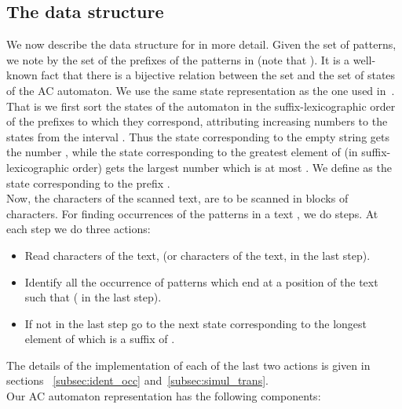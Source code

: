 \documentclass{article}
\newcommand{\?}{\mskip1.5mu}
\begin{document}
\subsection{The data structure}
We now describe the data structure for in more detail. Given the set  of  patterns, we note by  the set of the prefixes of the patterns in  (note that ). It is a well-known fact that there is a bijective relation between the set  and the set of states of the AC automaton. We use the same state representation as the one used in~\cite{B10a}. That is we first sort the states of the automaton in the suffix-lexicographic order of the prefixes to which they correspond, attributing increasing numbers to the states from the interval . Thus the state corresponding to the  empty string gets the number , while the state corresponding to the greatest element of  (in suffix-lexicographic order) gets the largest number which is at most . 
We define  as the state corresponding to the prefix . 
\\ 
Now, the characters of the scanned text, are to be scanned in blocks of  characters. 
For finding occurrences of the patterns in a text , we do  steps. At each step  we do three actions:
\begin{itemize}
\item Read  characters of the text,  (or  characters of the text,  in the last step).
\item Identify all the occurrence of patterns which end at a position  of the text such that  ( in the last step). 
\item If not in the last step go to the next state corresponding to the longest element of  which is a suffix of . 
\end{itemize}
The details of the implementation of each of the last two actions is given in sections ~\ref{subsec:ident_occ} and~\ref{subsec:simul_trans}. 
\\Our AC automaton representation has the following components:
\end{document}
